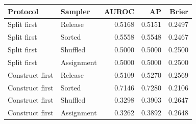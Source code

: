 \begin{tabular}{llrrr}
\toprule
Protocol & Sampler & AUROC & AP & Brier\\
\midrule
Split first & Release & 0.5168 & 0.5151 & 0.2497\\
Split first & Sorted & 0.5558 & 0.5548 & 0.2467\\
Split first & Shuffled & 0.5000 & 0.5000 & 0.2500\\
Split first & Assignment & 0.5000 & 0.5000 & 0.2500\\
Construct first & Release & 0.5109 & 0.5270 & 0.2569\\
Construct first & Sorted & 0.7146 & 0.7280 & 0.2106\\
Construct first & Shuffled & 0.3298 & 0.3903 & 0.2647\\
Construct first & Assignment & 0.3262 & 0.3892 & 0.2648\\
\bottomrule
\end{tabular}
